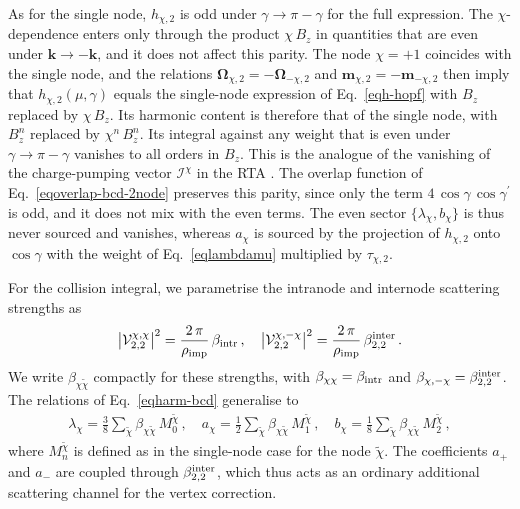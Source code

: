 \documentclass[aps,prb,onecolumn,nofootinbib,citeautoscript,10pt]{revtex4-2}
\newcommand{\bs}[1]{\boldsymbol{#1}}
\begin{document}
As for the single node, $h_{\chi,2}$ is odd under $\gamma\to\pi-\gamma$ for the full expression. The $\chi$-dependence enters only through the product $\chi\,B_z$ in quantities that are even under $\bs k\to-\bs k$, and it does not affect this parity. The node $\chi=+1$ coincides with the single node, and the relations $\bs\Omega_{\chi,2}=-\bs\Omega_{-\chi,2}$ and $\bs m_{\chi,2}=-\bs m_{-\chi,2}$ then imply that $h_{\chi,2}(\mu,\gamma)$ equals the single-node expression of Eq.~\eqref{eqh-hopf} with $B_z$ replaced by $\chi\,B_z$. Its harmonic content is therefore that of the single node, with $B_z^n$ replaced by $\chi^n\,B_z^n$. Its integral against any weight that is even under $\gamma\to\pi-\gamma$ vanishes to all orders in $B_z$. This is the analogue of the vanishing of the charge-pumping vector $\bs{\mathcal I}^\chi$ in the RTA \cite{ips-firdous-vnr}. The overlap function of Eq.~\eqref{eqoverlap-bcd-2node} preserves this parity, since only the term $4\,\cos\gamma\,\cos\gamma^\prime$ is odd, and it does not mix with the even terms. The even sector $\{\lambda_\chi,b_\chi\}$ is thus never sourced and vanishes, whereas $a_\chi$ is sourced by the projection of $h_{\chi,2}$ onto $\cos\gamma$ with the weight of Eq.~\eqref{eqlambdamu} multiplied by $\tau_{\chi,2}$.

For the collision integral, we parametrise the intranode and internode scattering strengths as
\begin{align}
\big|{\mathcal V}^{\chi,\chi}_{2,2}\big|^2
= \frac{2\,\pi}{\rho_{\rm imp}}\,\beta_{\rm intr} \,,\quad
\big|{\mathcal V}^{\chi,-\chi}_{2,2}\big|^2
= \frac{2\,\pi}{\rho_{\rm imp}}\,\beta^{\rm inter}_{2,2} \,.
\end{align}
We write $\beta_{\chi\tilde\chi}$ compactly for these strengths, with $\beta_{\chi\chi}=\beta_{\rm intr}$ and $\beta_{\chi,-\chi}=\beta^{\rm inter}_{2,2}$. The relations of Eq.~\eqref{eqharm-bcd} generalise to
\begin{align}
\lambda_\chi=\frac{3}{8}\sum_{\tilde\chi}\beta_{\chi\tilde\chi}\,M^{\tilde\chi}_0\,, \quad
a_\chi=\frac{1}{2}\sum_{\tilde\chi}\beta_{\chi\tilde\chi}\,M^{\tilde\chi}_1\,, \quad
b_\chi=\frac{1}{8}\sum_{\tilde\chi}\beta_{\chi\tilde\chi}\,M^{\tilde\chi}_2\,,
\end{align}
where $M^{\tilde\chi}_n$ is defined as in the single-node case for the node $\tilde\chi$. The coefficients $a_+$ and $a_-$ are coupled through $\beta^{\rm inter}_{2,2}$, which thus acts as an ordinary additional scattering channel for the vertex correction.
\end{document}
